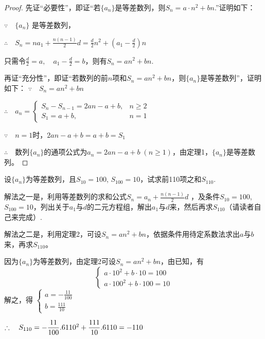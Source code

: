 \begin{proof}
    先证“必要性”，即证“若$\{a_n\}$是等差数列，则$S_n=a\cdot n^2+bn$.”证明如下：

$\because\quad \{a_n\}$ 是等差数列，

$\therefore\quad S_n=na_1+\frac{n(n-1)}{2}d=\frac{d}{2}n^2+\left(a_1-\frac{d}{2}\right)n$

只需令$\frac{d}{2}=a,\quad a_1-\frac{d}{2}=b$，则有$S_n=an^2+bn$.

再证“充分性”，即证“若数列的前$n$项和$S_n=an^2+bn$，则$\{a_n\}$是等差数列”，证明如下：
$\because\quad S_n=an^2+bn$

$\therefore\quad a_n=\begin{cases}
    S_n-S_{n-1}=2an-a+b, & n\ge 2\\
    S_1=a+b, & n=1
\end{cases}$

$\because\quad n=1$时，$2an-a+b=a+b=S_1$

$\therefore\quad $数列$\{a_n\}$的通项公式为$a_n=2an-a+b\; (n\ge 1)$，由定理1，$\{a_n\}$是等差数列。
\end{proof}


\begin{example}
    设$\{a_n\}$为等差数列，且$S_{10}=100$, $S_{100}=10$，试求前110项之和$S_{110}$.
\end{example}

\begin{analyze}
解法之一是，利用等差数列的求和公式$S_n=a_n+\frac{n(n-1)}{2}d$
，及条件$S_{10}=100$, $S_{100}=10$，列出关于$a_1$与$d$的二元方程组，解出$a_1$与$d$来，然后再求$S_{110}$（请读者自己来完成）.

解法之二是，利用定理2，可设$S_n=an^2+bn$，依据条件用待定系数法求出$a$与$b$来，再求$S_{110}$。
\end{analyze}

\begin{solution}
因为$\{a_n\}$为等差数列，由定理2可设$S_n=an^2+bn$，由已知，有
\[\begin{cases}
    a\cdot 10^2+b\cdot 10=100\\
    a\cdot 100^2+b\cdot 100=10
\end{cases}\]
解之，得
$\begin{cases}
    a=-\frac{11}{100}\\[1.5ex]
    b=\frac{111}{10}
\end{cases}$

$\therefore\quad S_{110}=-\dfrac{11}{100}.6 110^2+\dfrac{111}{10}.6 110=-110$
\end{solution}



